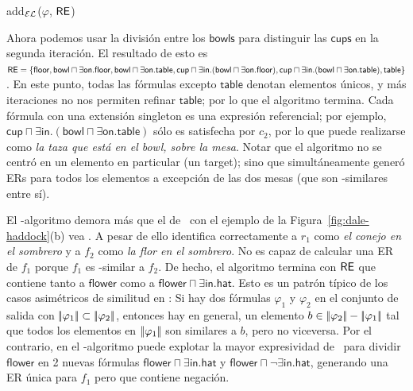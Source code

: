 %
\begin{algorithm}[t]
\dontprintsemicolon
\caption{add$_\mathcal{EL}$($\varphi$, $\textsf{RE}$)}
\label{algo:bisim-add-el}
\end{algorithm}
Ahora podemos usar la divisi\'on entre los $\mathsf{bowls}$ para distinguir las $\mathsf{cups}$ en
la segunda iteraci\'on. El resultado de esto es $\textsf{RE} = \{ \mathsf{floor},
\mathsf{bowl} \sqcap \exists \mathsf{on}.\mathsf{floor}, \mathsf{bowl}
\sqcap \exists \mathsf{on}.\mathsf{table}, \mathsf{cup} \sqcap \exists
\mathsf{in}. (\mathsf{bowl} \sqcap \exists
\mathsf{on}.\mathsf{floor}), \mathsf{cup} \sqcap \exists
\mathsf{in}. (\mathsf{bowl} \sqcap \exists
\mathsf{on}.\mathsf{table}), \mathsf{table} \}$. En este punto, todas las
f\'ormulas excepto $ \mathsf{table} $ denotan elementos \'unicos, y m\'as
iteraciones no nos permiten refinar $ \mathsf {table} $; por lo que el algoritmo
termina. Cada f\'ormula con una extensi\'on singleton es una expresi\'on referencial; por ejemplo, $\mathsf{cup} \sqcap \exists
\mathsf{in}. (\mathsf{bowl} \sqcap \exists \mathsf{on}.\mathsf{table})$ s\'olo es satisfecha por $ c_2 $, por lo que puede
realizarse como \textit{la taza que est\'a en el bowl, sobre la mesa}. Notar que
el algoritmo no se centr\'o en un elemento en particular (un target); sino que 
simult\'aneamente gener\'o ERs para todos los elementos a excepci\'on de las dos
mesas (que son \EL-similares entre s\'i).


El \el-algoritmo demora m\'as que el de \alc\ con el ejemplo de la Figura~\ref{fig:dale-haddock}(b) vea \cite{Stone1998a}. A pesar de ello
identifica correctamente a $r_1$ como \textit{el conejo en el sombrero} y a $ f_2$ como
\textit{la flor en el sombrero}. No es capaz de calcular una ER de $f_1$
porque $f_1$ es \el-similar a $f_2$. De hecho, el algoritmo
termina con $ \textsf{RE} $ que contiene tanto a $\mathsf{flower}$ como a
$\mathsf{flower} \sqcap \exists \mathsf{in}.\mathsf{hat}$. Esto es un
patr\'on t\'ipico de los casos asim\'etricos de similitud en \EL: Si hay
dos f\'ormulas $ \varphi_1 $ y $ \varphi_2$ en el conjunto de salida con
$|\!|\varphi_1|\!| \subset |\!|\varphi_2|\!|$, entonces hay
en general, un elemento $b \in |\!|\varphi_2|\!| -
|\!|\varphi_1|\!|$ tal que todos los elementos en $|\!|\varphi_1|\!| $ 
son similares a $ b $, pero no viceversa. Por el contrario, en el \alc-algoritmo puede explotar la mayor expresividad de \alc\ para dividir
$\mathsf{flower}$ en 2 nuevas f\'ormulas $\mathsf{flower} \sqcap
\exists \mathsf{in}.\mathsf{hat}$ y $\mathsf{flower} \sqcap \neg
\exists \mathsf{in}.\mathsf{hat}$, generando una ER \'unica para $f_1  $ pero que contiene negaci\'on.

